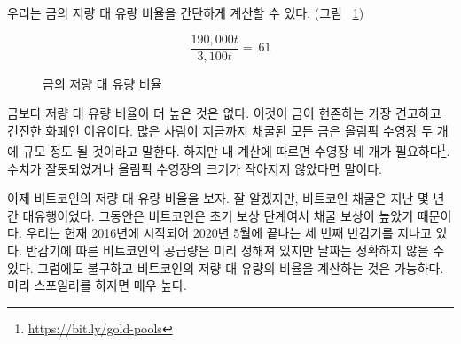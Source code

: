 \begin{comment}	
	Using these numbers, we can easily calculate the stock-to-flow ratio for
	gold (see Figure~\ref{fig:stock-to-flow-gold}).
\end{comment}
우리는 금의 저량 대 유량 비율을 간단하게 계산할 수 있다. (그림 ~\ref{fig:stock-to-flow-gold})

\begin{figure}
	\centering
	\begin{equation}
		\frac{190,000 t}{3,100 t} = ~ 61
	\end{equation}
	\caption{금의 저량 대 유량 비율}
	\label{fig:stock-to-flow-gold}
\end{figure}

\begin{comment}	
	Nothing has a higher stock-to-flow ratio than gold. This is why gold, up to now,
	was the hardest, soundest money in existence. It is often said that all the gold
	mined so far would fit in two olympic-sized swimming pools. According to my
	calculations\footnote{\url{https://bit.ly/gold-pools}}, we would need four. So
	maybe this needs updating, or Olympic-sized swimming pools got smaller.
\end{comment}
금보다 저량 대 유량 비율이 더 높은 것은 없다. 
이것이 금이 현존하는 가장 견고하고 건전한 화폐인 이유이다. 
많은 사람이 지금까지 채굴된 모든 금은 올림픽 수영장 두 개에 규모 정도 될 것이라고 말한다.
하지만 내 계산에 따르면 수영장 네 개가 필요하다\footnote{\url{https://bit.ly/gold-pools}}. 
수치가 잘못되었거나 올림픽 수영장의 크기가 작아지지 않았다면 말이다.

\begin{comment}	
	Enter Bitcoin. As you probably know, bitcoin mining was all the rage in
	the last couple of years. This is because we are still in the early
	phases of what is called the \textit{reward era}, where mining nodes are
	rewarded with \textit{a lot} of bitcoin for their computational effort. We are
	currently in reward era number 3, which began in 2016 and will end in
	early 2020, probably in May. While the bitcoin supply is predetermined,
	the inner workings of Bitcoin only allow for approximate dates.
	Nevertheless, we can predict with certainty how high Bitcoin's
	stock-to-flow ratio will be. Spoiler alert: it will be high.
\end{comment}
이제 비트코인의 저량 대 유량 비율을 보자. 
잘 알겠지만, 비트코인 채굴은 지난 몇 년간 대유행이었다.
그동안은 비트코인은 초기 보상 단계여서 채굴 보상이 높았기 때문이다.
우리는 현재 2016년에 시작되어 2020년 5월에 끝나는 세 번째 반감기를 지나고 있다.
반감기에 따른 비트코인의 공급량은 미리 정해져 있지만 날짜는 정확하지 않을 수 있다.
그럼에도 불구하고 비트코인의 저량 대 유량의 비율을 계산하는 것은 가능하다.
미리 스포일러를 하자면 매우 높다.


